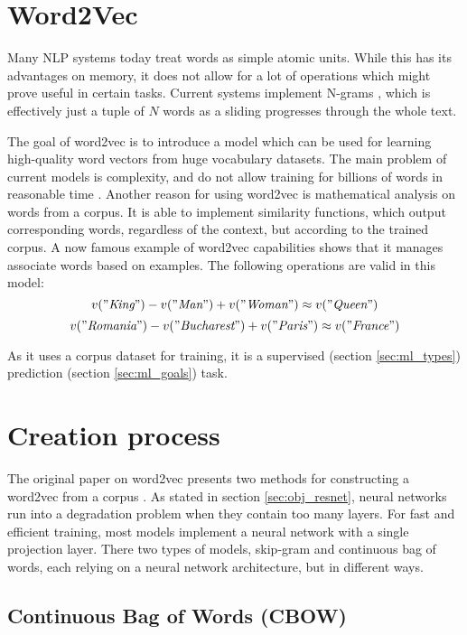 \section{Word2Vec}
\label{sec:words_word2vec}

Many NLP systems today treat words as simple atomic units. While this has its advantages on memory, it does not allow for a lot of operations which might prove useful in certain tasks. Current systems implement N-grams \cite{word2vec}, which is effectively just a tuple of $N$ words as a sliding progresses through the whole text.

The goal of word2vec is to introduce a model which can be used for learning high-quality word vectors from huge vocabulary datasets. The main problem of current models is complexity, and do not allow training for billions of words in reasonable time \cite{word2vec}. Another reason for using word2vec is mathematical analysis on words from a corpus. It is able to implement similarity functions, which output corresponding words, regardless of the context, but according to the trained corpus. A now famous example of word2vec capabilities shows that it manages associate words based on examples. The following operations are valid in this model:
$$ v("\textit{King}") - v("\textit{Man}") + v("\textit{Woman}") \approx v("\textit{Queen}") $$
$$ v("\textit{Romania}") - v("\textit{Bucharest}") + v("\textit{Paris}") \approx v("\textit{France}") $$

As it uses a corpus dataset for training, it is a supervised (section \ref{sec:ml_types}) prediction (section \ref{sec:ml_goals}) task.

\section{Creation process}
\label{sec:words_creation}

The original paper on word2vec presents two methods for constructing a word2vec from a corpus \cite{word2vec}. As stated in section \ref{sec:obj_resnet}, neural networks run into a degradation problem when they contain too many layers. For fast and efficient training, most models implement a neural network with a single projection layer. There two types of models, skip-gram and continuous bag of words, each relying on a neural network architecture, but in different ways.

\subsection{Continuous Bag of Words (CBOW)}
\label{subsec:words_creation_cbow}

